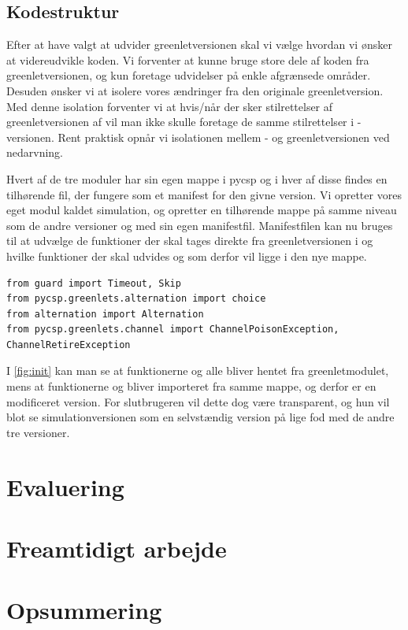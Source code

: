\subsection{Kodestruktur}  Efter at have valgt at udvider greenletversionen skal vi vælge hvordan vi ønsker at videreudvikle koden. Vi forventer at kunne bruge store dele af koden fra greenletversionen, og kun foretage udvidelser på enkle afgrænsede områder. Desuden ønsker vi at isolere vores ændringer fra den originale greenletversion. Med denne isolation forventer vi at hvis/når der sker stilrettelser af greenletversionen af \pycsp vil man ikke skulle foretage de samme stilrettelser i \des-versionen. 
Rent praktisk opnår vi isolationen mellem \des- og greenletversionen ved nedarvning. 

Hvert af de tre moduler har sin egen mappe i pycsp og i hver af disse findes en tilhørende  fil, der fungere som et manifest for den givne version. Vi opretter vores eget modul kaldet simulation, og opretter en tilhørende mappe på samme niveau som de andre versioner og med sin egen manifestfil. Manifestfilen kan nu bruges til at udvælge de funktioner der skal tages direkte fra greenletversionen i og hvilke funktioner der skal udvides og som derfor vil ligge i den nye mappe.

\begin{lstlisting}[float=hbtp,label=fig:init,caption=Uddrag af \code{\_\_init\_\_.py} for simulationsversionen.]
from guard import Timeout, Skip
from pycsp.greenlets.alternation import choice
from alternation import Alternation
from pycsp.greenlets.channel import ChannelPoisonException, ChannelRetireException
\end{lstlisting}

I \cref{fig:init} kan man se at funktionerne  og  alle bliver hentet fra greenletmodulet, mens at funktionerne  og  bliver importeret fra samme mappe, og derfor er en modificeret version. For slutbrugeren  vil dette dog være transparent, og hun vil blot se simulationversionen som en selvstændig version på lige fod med de andre tre versioner.


 
    
  \section{Evaluering}
  \section{Freamtidigt arbejde}
  \section{Opsummering}
